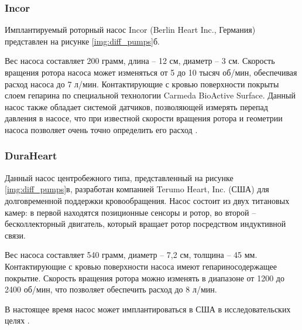 
\subsubsection*{Incor}

Имплантируемый роторный насос Incor (Berlin Heart Inc., Германия) представлен на рисунке \ref{img:diff_pumps}б. 

Вес насоса составляет 200 грамм, длина -- 12 см, диаметр -- 3 см. Скорость вращения ротора насоса может изменяться от 5 до 10 тысяч об/мин, обеспечивая расход насоса до 7 л/мин. Контактирующие с кровью поверхности покрыты слоем гепарина по специальной технологии Carmeda BioActive Surface. Данный насос также обладает системой датчиков, позволяющей измерять перепад давления в насосе, что при известной скорости вращения ротора и геометрии насоса позволяет очень точно определить его расход \cite{Schmid20051188, Hetzer01062004}. 


\subsubsection*{DuraHeart}

Данный насос центробежного типа, представленный на рисунке \ref{img:diff_pumps}в, разработан компанией Terumo Heart, Inc. (США) для долговременной поддержки кровообращения. Насос состоит из двух титановых камер: в первой находятся позиционные сенсоры и ротор, во второй – бесколлекторный двигатель, который вращает ротор посредством индуктивной связи. 

Вес насоса составляет 540 грамм, диаметр -- 7,2 см, толщина -- 45 мм. Контактирующие с кровью поверхности насоса имеют гепариносодержащее покрытие. Скорость вращения ротора можно изменять в диапазоне от 1200 до 2400 об/мин, что позволяет обеспечить расход до 8 л/мин.

В настоящее время насос может имплантироваться в США в исследовательских целях \cite{DuraHeart, Morshuis01062009}.


